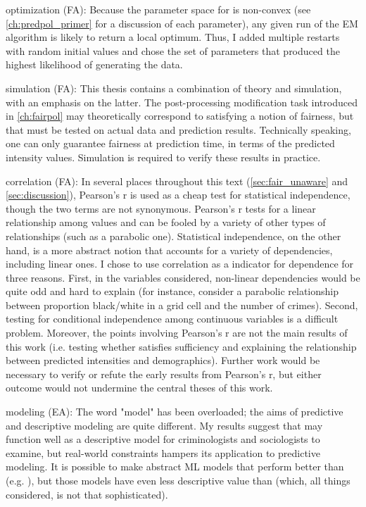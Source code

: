\begin{itemize}
\hashtag optimization (FA): Because the parameter space for \pp is non-convex (see \autoref{ch:predpol_primer} for a discussion of each parameter), any given run of the EM algorithm is likely to return a local optimum. Thus, I added multiple restarts with random initial values and chose the set of parameters that produced the highest likelihood of generating the data.

\hashtag simulation (FA): This thesis contains a combination of theory and simulation, with an emphasis on the latter. The post-processing modification task introduced in \autoref{ch:fairpol} may theoretically correspond to satisfying a notion of fairness, but that must be tested on actual data and prediction results. Technically speaking, one can only guarantee fairness at prediction time, in terms of the predicted intensity values. Simulation is required to verify these results in practice.


\hashtag correlation (FA): In several places throughout this text (\autoref{sec:fair_unaware} and \autoref{sec:discussion}), Pearson's r is used as a cheap test for statistical independence, though the two terms are not synonymous. Pearson's r tests for a linear relationship among values and can be fooled by a variety of other types of relationships (such as a parabolic one). Statistical independence, on the other hand, is a more abstract notion that accounts for a variety of dependencies, including linear ones. I chose to use correlation as a indicator for dependence for three reasons. First, in the variables considered, non-linear dependencies would be quite odd and hard to explain (for instance, consider a parabolic relationship between proportion black/white in a grid cell and the number of crimes). Second, testing for conditional independence among continuous variables is a difficult problem. Moreover, the points involving Pearson's r are not the main results of this work (i.e. testing whether \pp satisfies sufficiency and explaining the relationship between predicted intensities and demographics). Further work would be necessary to verify or refute the early results from Pearson's r, but either outcome would not undermine the central theses of this work.

\hashtag modeling (EA): The word "model" has been overloaded; the aims of predictive and descriptive modeling are quite different. My results suggest that \pp may function well as a descriptive model for criminologists and sociologists to examine, but real-world constraints hampers its application to predictive modeling. It is possible to make abstract ML models that perform better than \pp  (e.g. \citet{flaxman_scalable_2018}), but those models have even less descriptive value than \pp (which, all things considered, is not that sophisticated).


\end{itemize}
